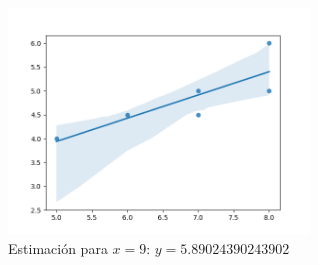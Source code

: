 \documentclass[addpoints,spanish, 12pt,a4paper]{exam}
\begin{document}
\begin{questions}
\begin{solution}
\includegraphics[width=8cm]{pendientes_1_bach/1_sociales/regresion1.png} 
\\

Estimación para $x=9$:
$y=5.89024390243902$

\end{solution}
\end{questions}
\end{document}
